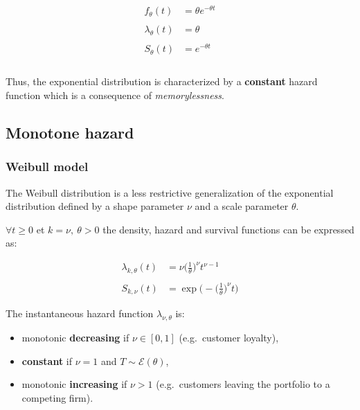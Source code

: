 \documentclass[
]{book}
\providecommand{\tightlist}{%
  \setlength{\itemsep}{0pt}\setlength{\parskip}{0pt}}
\begin{document}
\begin{equation}
  \begin{aligned}
    f_{\theta}(t) & = \theta e^{-\theta t} \\\\
    \lambda_{\theta}(t) & = \theta \\\\
    S_{\theta}(t) & = e^{-\theta t} \\\\
  \end{aligned}
  \label{eq:exponential}
\end{equation}

Thus, the exponential distribution is characterized by a \textbf{constant} hazard function which is a consequence of \emph{memorylessness}.

\hypertarget{monotone-hazard}{%
\subsection{Monotone hazard}\label{monotone-hazard}}

\hypertarget{weibull-model}{%
\subsubsection*{Weibull model}\label{weibull-model}}

The Weibull distribution is a less restrictive generalization of the exponential distribution defined by a shape parameter \(\nu\) and a scale parameter \(\theta\).

\(\forall t \geq 0\) et \(k=\nu,\ \theta > 0\) the density, hazard and survival functions can be expressed as:

\begin{equation}
  \begin{aligned}
      \lambda_{k,\theta}(t) & = \nu \bigg(\frac{1}{\theta}\bigg)^{\nu} t^{\nu - 1} \\\\
      S_{k, \nu}(t) & = \exp \Bigg( -\bigg(\frac{1}{\theta}\bigg)^{\nu} t\Bigg) 
  \end{aligned}
  \label{eq:weibull}
\end{equation}

The instantaneous hazard function \(\lambda_{\nu,\theta}\) is:

\begin{itemize}
\tightlist
\item
  monotonic \textbf{decreasing} if \(\nu \in [0, 1]\) (e.g.~customer loyalty),
\item
  \textbf{constant} if \(\nu=1\) and \(T \sim \mathcal{E}(\theta)\),
\item
  monotonic \textbf{increasing} if \(\nu > 1\) (e.g.~customers leaving the portfolio to a competing firm).
\end{itemize}
\end{document}
